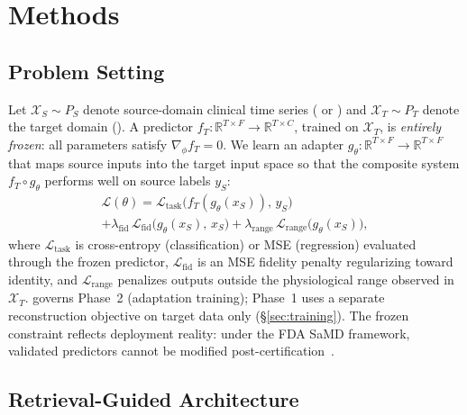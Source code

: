 
\section{Methods}
\label{sec:method}

\subsection{Problem Setting}
\label{sec:problem}

Let $\mathcal{X}_S \sim P_S$ denote source-domain clinical time series (\eicu{} or \hirid{}) and $\mathcal{X}_T \sim P_T$ denote the target domain (\mimic{}).
A predictor $f_T : \mathbb{R}^{T \times F} \to \mathbb{R}^{T \times C}$, trained on $\mathcal{X}_T$, is \emph{entirely frozen}: all parameters satisfy $\nabla_\phi f_T = 0$.
We learn an adapter $g_\theta : \mathbb{R}^{T \times F} \to \mathbb{R}^{T \times F}$ that maps source inputs into the target input space so that the composite system $f_T \circ g_\theta$ performs well on source labels $y_S$:
\begin{multline}
\label{eq:objective}
\mathcal{L}(\theta) = \mathcal{L}_{\mathrm{task}}\!\bigl(f_T(g_\theta(x_S)),\, y_S\bigr) \\
+ \lambda_{\mathrm{fid}}\,\mathcal{L}_{\mathrm{fid}}\!\bigl(g_\theta(x_S),\, x_S\bigr)
+ \lambda_{\mathrm{range}}\,\mathcal{L}_{\mathrm{range}}\!\bigl(g_\theta(x_S)\bigr),
\end{multline}
where $\mathcal{L}_{\mathrm{task}}$ is cross-entropy (classification) or MSE (regression) evaluated through the frozen predictor, $\mathcal{L}_{\mathrm{fid}}$ is an MSE fidelity penalty regularizing toward identity, and $\mathcal{L}_{\mathrm{range}}$ penalizes outputs outside the physiological range observed in $\mathcal{X}_T$.
 governs Phase~2 (adaptation training); Phase~1 uses a separate reconstruction objective on target data only (\S\ref{sec:training}).
The frozen constraint reflects deployment reality: under the FDA SaMD framework, validated predictors cannot be modified post-certification~\citep{fda2021samd}.

\subsection{Retrieval-Guided Architecture}
\label{sec:architecture}



